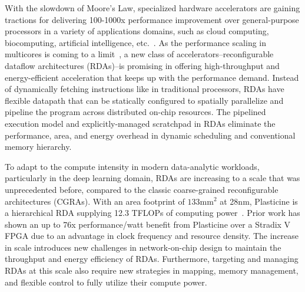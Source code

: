 
With the slowdown of Moore’s Law, specialized hardware accelerators are gaining tractions 
for delivering 100-1000x performance improvement over general-purpose
processors in a variety of applications domains, such as cloud computing, biocomputing, 
artificial intelligence, etc.~\cite{fpgacloudsurvey,bioaccel,genomicaccel}.
As the performance scaling in multicores is coming to a limit~\cite{multicorescale}, a new
class of accelerators--reconfigurable dataflow architectures (RDAs)--is promising in 
offering high-throughput and energy-efficient acceleration that keeps up with the performance demand.
Instead of dynamically fetching instructions like in traditional processors, RDAs have flexible datapath 
that can be statically configured to spatially parallelize and pipeline the program across
distributed on-chip resources. 
The pipelined execution model and explicitly-managed scratchpad in RDAs eliminate
the performance, area, and energy overhead in dynamic scheduling and conventional memory hierarchy.

To adapt to the compute intensity in modern data-analytic workloads, particularly in the deep learning
domain, RDAs are increasing to a scale that was unprecedented before, compared to the classic coarse-grained
reconfigurable architectures (CGRAs).
With an area footprint of $133\text{mm}^2$ at 28nm, 
Plasticine is a hierarchical RDA supplying 12.3 TFLOPs of computing power~\cite{plasticine}.
Prior work has shown an up to 76x performance/watt benefit from Plasticine over a Stradix V FPGA 
due to an advantage in clock frequency and resource density.
The increase in scale introduces new challenges in network-on-chip design to maintain 
the throughput and energy efficiency of RDAs.
Furthermore, targeting and managing RDAs at this scale also require new strategies in mapping, 
memory management, and flexible control to fully utilize their compute power. 

